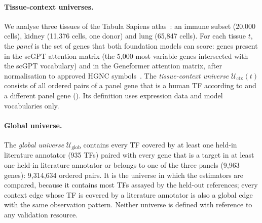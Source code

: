 \documentclass[11pt,a4paper]{article}
\begin{document}
\paragraph{Tissue-context universes.}
We analyse three tissues of the Tabula Sapiens atlas~\citep{tabula2022}: an immune subset (20{,}000 cells), kidney (11{,}376 cells, one donor) and lung (65{,}847 cells).
For each tissue $t$, the \emph{panel} is the set of genes that both foundation models can score: genes present in the scGPT attention matrix (the 5{,}000 most variable genes intersected with the scGPT vocabulary) and in the Geneformer attention matrix, after normalisation to approved HGNC symbols~\citep{seal2023hgnc}.
The \emph{tissue-context universe} $\mathcal{U}_{\mathrm{ctx}}(t)$ consists of all ordered pairs of a panel gene that is a human TF according to \citet{lambert2018human} and a different panel gene ().
Its definition uses expression data and model vocabularies only.

\paragraph{Global universe.}
The \emph{global universe} $\mathcal{U}_{\mathrm{glob}}$ contains every TF covered by at least one held-in literature annotator (935 TFs) paired with every gene that is a target in at least one held-in literature annotator or belongs to one of the three panels (9{,}963 genes): 9{,}314{,}634 ordered pairs.
It is the universe in which the estimators are compared, because it contains most TFs assayed by the held-out references; every context edge whose TF is covered by a literature annotator is also a global edge with the same observation pattern.
Neither universe is defined with reference to any validation resource.
\end{document}
